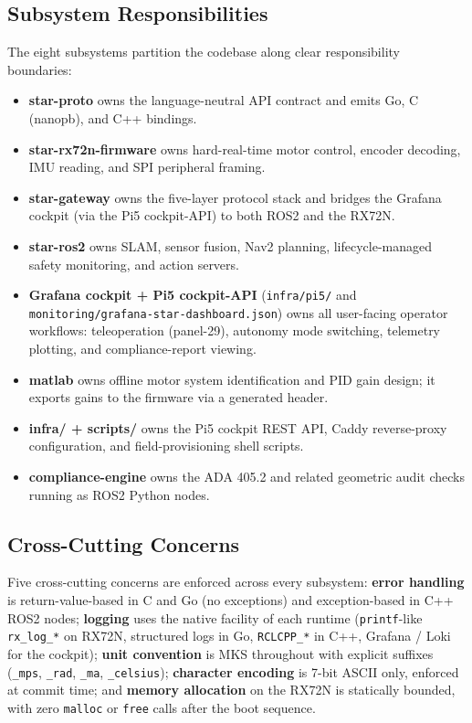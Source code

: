 \documentclass[11pt,letterpaper]{article}
\begin{document}
\subsection{Subsystem Responsibilities}
The eight subsystems partition the codebase along clear responsibility
boundaries:

\begin{itemize}[leftmargin=1.4em,itemsep=2pt]
\item \textbf{star-proto} owns the language-neutral API contract and
      emits Go, C (nanopb), and C++ bindings.
\item \textbf{star-rx72n-firmware} owns hard-real-time motor control,
      encoder decoding, IMU reading, and SPI peripheral framing.
\item \textbf{star-gateway} owns the five-layer protocol stack and
      bridges the Grafana cockpit (via the Pi5 cockpit-API) to both
      ROS2 and the RX72N.
\item \textbf{star-ros2} owns SLAM, sensor fusion, Nav2 planning,
      lifecycle-managed safety monitoring, and action servers.
\item \textbf{Grafana cockpit + Pi5 cockpit-API} (\texttt{infra/pi5/}
      and \texttt{monitoring/grafana-star-dashboard.json}) owns all
      user-facing operator workflows: teleoperation (panel-29),
      autonomy mode switching, telemetry plotting, and
      compliance-report viewing.
\item \textbf{matlab} owns offline motor system identification and
      PID gain design; it exports gains to the firmware via a
      generated header.
\item \textbf{infra/ + scripts/} owns the Pi5 cockpit REST API, Caddy
      reverse-proxy configuration, and field-provisioning shell
      scripts.
\item \textbf{compliance-engine} owns the ADA 405.2 and related
      geometric audit checks running as ROS2 Python nodes.
\end{itemize}

\subsection{Cross-Cutting Concerns}
Five cross-cutting concerns are enforced across every subsystem:
\textbf{error handling} is return-value-based in C and Go (no
exceptions) and exception-based in C++ ROS2 nodes; \textbf{logging}
uses the native facility of each runtime
(\texttt{printf}-like \texttt{rx\_log\_*} on RX72N, structured logs in
Go, \texttt{RCLCPP\_*} in C++, Grafana / Loki for the cockpit);
\textbf{unit convention} is MKS throughout with explicit suffixes
(\texttt{\_mps}, \texttt{\_rad}, \texttt{\_ma}, \texttt{\_celsius});
\textbf{character encoding} is 7-bit ASCII only, enforced at commit
time; and \textbf{memory allocation} on the RX72N is statically
bounded, with zero \texttt{malloc} or \texttt{free} calls after the
boot sequence.
\end{document}
